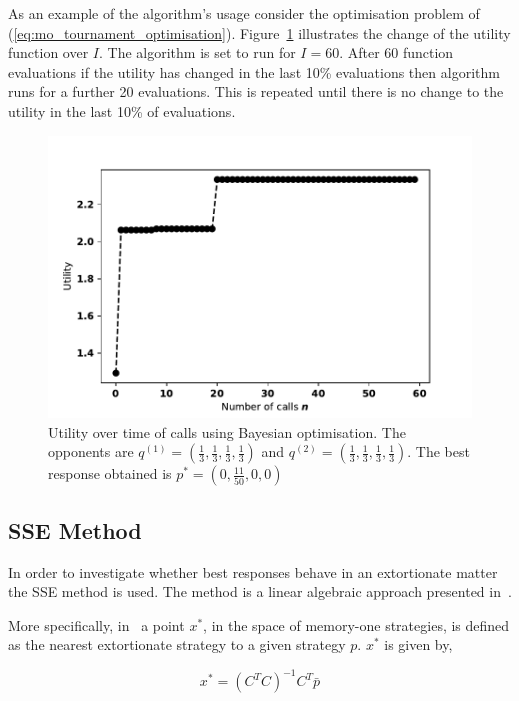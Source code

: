 As an example of the algorithm's usage consider the optimisation problem
of (\ref{eq:mo_tournament_optimisation}). Figure~\ref{bayesian_example}
illustrates the change of the utility function over \(I\).
The algorithm is set to run for \(I=60\). After 60 function evaluations if the
utility has changed in the last 10\% evaluations then algorithm runs for a
further 20 evaluations. This is repeated until there is no change to the utility
in the last 10\% of evaluations.


\begin{figure}[!htbp]
    \begin{center}
    \includegraphics[width=.5\linewidth]{src/chapters/05/paper/memory-size-in-the-prisoners-dilemma/img/bayesian_example.pdf}
    \end{center}
    \caption{Utility over time of calls using Bayesian optimisation. The
    opponents are \(q^{(1)} = (\frac{1}{3}, \frac{1}{3}, \frac{1}{3},
    \frac{1}{3})\) and \(q^{(2)} = (\frac{1}{3}, \frac{1}{3},
    \frac{1}{3}, \frac{1}{3})\). The best response obtained is \(p^* = (0, \frac{11}{50}, 0, 0)\)}
    \label{bayesian_example}
\end{figure}

\subsection{SSE Method}\label{section:sse}

In order to investigate whether best responses behave in an extortionate matter
the SSE method is used. The method is a linear algebraic approach presented
in~\cite{Knight2019}.

More specifically, in~\cite{Knight2019} a point \(x^*\), in the space of
memory-one strategies, is defined as the nearest extortionate strategy to a
given strategy \(p\). \(x^*\) is given by,

\begin{equation}\label{eqn:x_star_formula}
    x^* = {\left(C^{T}C\right)}^{-1}C^{T}\bar{p}
\end{equation}

